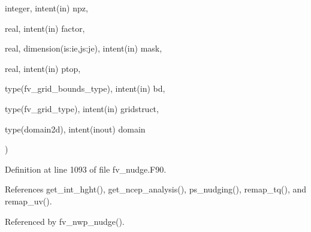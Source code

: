 {\begin{DoxyParamCaption}
\item[{integer, intent(in)}]{npz, }
\item[{real, intent(in)}]{factor, }
\item[{real, dimension(is\-:ie,js\-:je), intent(in)}]{mask, }
\item[{real, intent(in)}]{ptop, }
\item[{type(fv\-\_\-grid\-\_\-bounds\-\_\-type), intent(in)}]{bd, }
\item[{type(fv\-\_\-grid\-\_\-type), intent(in)}]{gridstruct, }
\item[{type(domain2d), intent(inout)}]{domain}
\end{DoxyParamCaption}
)\hspace{0.3cm}{\ttfamily [private]}}\label{classfv__nwp__nudge__mod_ad4f57cb75a42402e0aa82812192b504f}


Definition at line 1093 of file fv\-\_\-nudge.\-F90.



References get\-\_\-int\-\_\-hght(), get\-\_\-ncep\-\_\-analysis(), ps\-\_\-nudging(), remap\-\_\-tq(), and remap\-\_\-uv().



Referenced by fv\-\_\-nwp\-\_\-nudge().

